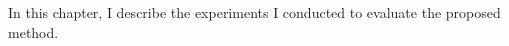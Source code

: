 \label{chapter:experiments}

In this chapter, I describe the experiments I conducted to evaluate the proposed method.


